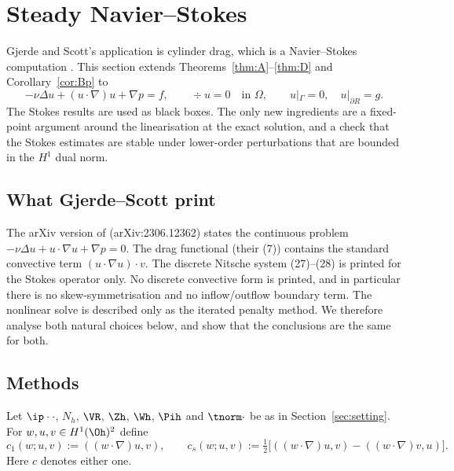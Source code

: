 
\providecommand{\Aop}{\mathfrak A}
\providecommand{\GS}{\mathrm{GS}}

\section{Steady Navier--Stokes}\label{ns:sec}

Gjerde and Scott's application is cylinder drag, which is a Navier--Stokes computation \cite{GjerdeScott2024}. This section extends Theorems~\ref{thm:A}--\ref{thm:D} and Corollary~\ref{cor:Bp} to
\[
-\nu\Delta u+(u\cdot\nabla)u+\nabla p=f,\qquad \div u=0\quad\text{in }\Omega,\qquad u|_\Gamma=0,\quad u|_{\partial R}=g .
\]
The Stokes results are used as black boxes. The only new ingredients are a fixed-point argument around the linearisation at the exact solution, and a check that the Stokes estimates are stable under lower-order perturbations that are bounded in the $H^1$ dual norm.

\subsection{What Gjerde--Scott print}\label{ns:gsprint}
The arXiv version of \cite{GjerdeScott2024} (arXiv:2306.12362) states the continuous problem $-\nu\Delta u+u\cdot\nabla u+\nabla p=0$. The drag functional (their (7)) contains the standard convective term $(u\cdot\nabla u)\cdot v$. The discrete Nitsche system (27)--(28) is printed for the Stokes operator only. No discrete convective form is printed, and in particular there is no skew-symmetrisation and no inflow/outflow boundary term. The nonlinear solve is described only as the iterated penalty method. We therefore analyse both natural choices below, and show that the conclusions are the same for both.

\subsection{Methods}
Let $\ip\cdot\cdot$, $N_h$, $\VR$, $\Zh$, $\Wh$, $\Pih$ and $\tnorm\cdot$ be as in Section~\ref{sec:setting}. For $w,u,v\in H^1(\Oh)^2$ define
\[
c_1(w;u,v):=((w\cdot\nabla)u,v),\qquad
c_s(w;u,v):=\tfrac12\bigl[((w\cdot\nabla)u,v)-((w\cdot\nabla)v,u)\bigr].
\]
Here $c$ denotes either one.

